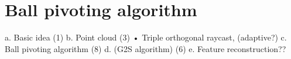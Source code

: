 
\chapter{Ball pivoting algorithm}
\label{ch:bpa}

a.	Basic idea (1)
b.	Point cloud (3)
•	Triple orthogonal raycast, (adaptive?)
c.	Ball pivoting algorithm (8)
d.	(G2S algorithm) (6)
e.	 Feature reconstruction??
